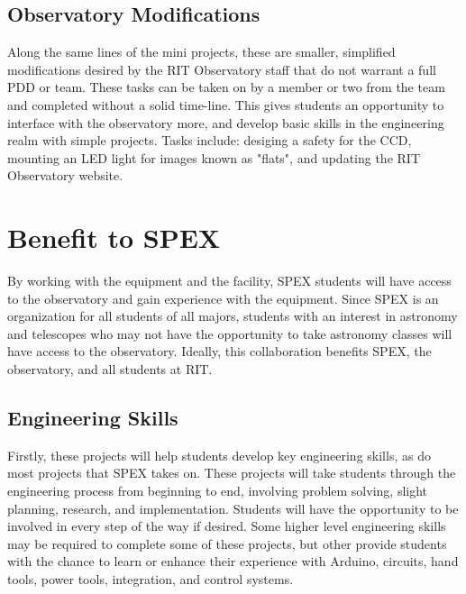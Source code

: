 \documentclass[conference]{IEEEtran} %
\begin{document}
\subsection{Observatory Modifications}
\label{subsec:obs}

Along the same lines of the mini projects, these are smaller, simplified modifications desired by the RIT Observatory staff that do not warrant a full PDD or team. These tasks can be taken on by a member or two from the team and completed without a solid time-line. This gives students an opportunity to interface with the observatory more, and develop basic skills in the engineering realm with simple projects. Tasks include: desiging a safety for the CCD, mounting an LED light for images known as "flats", and updating the RIT Observatory website.

  
  

\section{Benefit to SPEX}
\label{sec:benefit}
By working with the equipment and the facility, SPEX students will have access to the observatory and gain experience with the equipment. Since SPEX is an organization for all students of all majors, students with an interest in astronomy and telescopes who may not have the opportunity to take astronomy classes will have access to the observatory. Ideally, this collaboration benefits SPEX, the observatory, and all students at RIT.



\subsection{Engineering Skills}
\label{subsec:mindset}
Firstly, these projects will help students develop key engineering skills, as do most projects that SPEX takes on. These projects will take students through the engineering process from beginning to end, involving problem solving, slight planning, research, and implementation. Students will have the opportunity to be involved in every step of the way if desired. Some higher level engineering skills may be required to complete some of these projects, but other provide students with the chance to learn or enhance their experience with Arduino, circuits, hand tools, power tools, integration, and control systems. 
\end{document}
